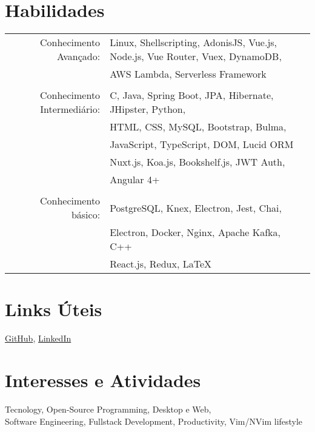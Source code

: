 \documentclass[a4paper,10pt]{article}
\begin{document}
\section{Habilidades}
\begin{tabular}{rl}
 Conhecimento Avançado:& Linux, Shellscripting, AdonisJS, Vue.js, Node.js, Vue Router, Vuex, DynamoDB, \\& AWS Lambda, Serverless Framework\\\\
 Conhecimento Intermediário:& \textsc{C}, Java, Spring Boot, JPA, Hibernate, JHipster, Python, \\ &HTML, CSS, My\textsc{SQL}, Bootstrap, Bulma,\\& JavaScript, TypeScript, DOM, Lucid ORM\\& Nuxt.js, Koa.js, Bookshelf.js, JWT Auth,\\&Angular 4+\\\\
 Conhecimento básico: & PostgreSQL, Knex, Electron, Jest, Chai, \\ & Electron, Docker, Nginx, Apache Kafka, C++\\
 &React.js, Redux, LaTeX
\end{tabular}

\section{Links Úteis}
\href{https://github.com/Lakshamana}{GitHub}, \href{https://www.linkedin.com/in/guilherme-albuquerque-622421127}{LinkedIn}\\

\section{Interesses e Atividades}
Tecnology, Open-Source Programming, Desktop e Web, \\Software Engineering, Fullstack Development, Productivity, Vim/NVim lifestyle

\end{document}
